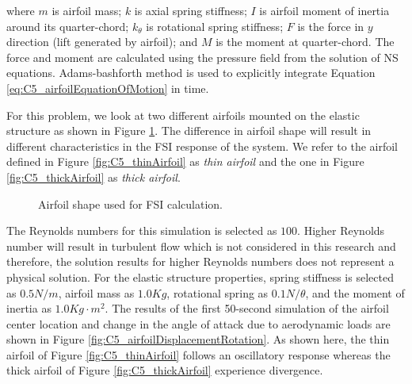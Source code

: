 %
where $m$ is airfoil mass; $k$ is axial spring stiffness; $I$ is airfoil moment of inertia around its quarter-chord; $k_\theta$ is rotational spring stiffness; $F$ is the force in $y$ direction (lift generated by airfoil); and $M$ is the moment at quarter-chord. The force and moment are calculated using the pressure field from the solution of NS equations. Adams-bashforth method is used to explicitly integrate Equation \eqref{eq:C5_airfoilEquationOfMotion} in time.

For this problem, we look at two different airfoils mounted on the elastic structure as shown in Figure \ref{fig:C5_airfoilShape}. The difference in airfoil shape will result in different characteristics in the FSI response of the system. We refer to the airfoil defined in Figure \ref{fig:C5_thinAirfoil} as \emph{thin airfoil} and the one in Figure \ref{fig:C5_thickAirfoil} as \emph{thick airfoil}.
%
\begin{figure}[H]
    \centering
    \quad
    \caption{Airfoil shape used for FSI calculation.}
    \label{fig:C5_airfoilShape}
\end{figure}
%
The Reynolds numbers for this simulation is selected as $100$. Higher Reynolds number will result in turbulent flow which is not considered in this research and therefore, the solution results for higher Reynolds numbers does not represent a physical solution. For the elastic structure properties, spring stiffness is selected as $0.5 N/m$, airfoil mass as $1.0 Kg$, rotational spring as $0.1 N/\theta$, and the moment of inertia as $1.0 Kg \cdot m^2$. The results of the first 50-second simulation of the airfoil center location and change in the angle of attack due to aerodynamic loads are shown in Figure \ref{fig:C5_airfoilDisplacementRotation}. As shown here, the thin airfoil of Figure \ref{fig:C5_thinAirfoil} follows an oscillatory response whereas the thick airfoil of Figure \ref{fig:C5_thickAirfoil} experience divergence.
